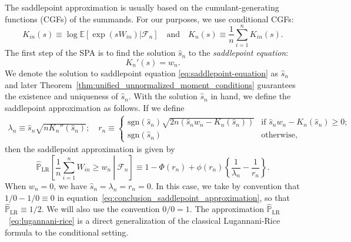 \documentclass[12pt]{article}
\theoremstyle{definition}
\def\P{\mathbb{P}}
\def\sgn{\mathrm{sgn}}
\def\P{\mathbb{P}}
\newcommand{\E}{\mathbb E}								%
\renewcommand{\P}{\mathbb{P}}							%
\begin{document}
  The saddlepoint approximation is usually based on the cumulant-generating functions (CGFs) of the summands. For our purposes, we use conditional CGFs:
  \begin{equation}\label{eq:CCGF_def}
  K_{in}(s) \equiv \log \E[\exp(sW_{in})|\mathcal F_n] \quad \text{and} \quad K_n(s) \equiv \frac{1}{n}\sum_{i = 1}^n K_{in}(s).
  \end{equation}
  The first step of the SPA is to find the solution $\hat s_n$ to the \textit{saddlepoint equation}:
  \begin{equation}\label{eq:saddlepoint-equation}
  K_n'(s) = w_n.
  \end{equation}
  We denote the solution to saddlepoint equation \eqref{eq:saddlepoint-equation} as $\hat s_n$ and later Theorem~\ref{thm:unified_unnormalized_moment_conditions} guarantees the existence and uniqueness of $\hat s_n$. With the solution $\hat s_n$ in hand, we define the saddlepoint approximation as follows. If we define
  \small
  \begin{align}\label{eq:lam_n_r_n_def}
	\lambda_n \equiv \hat s_n\sqrt{nK_n''(\hat s_n)}; \quad r_n \equiv
	\begin{cases}
	  \sgn(\hat s_n) \sqrt{2n( \hat s_n w_n - K_n(\hat s_n))} & \text{if } \hat s_n w_n - K_n(\hat s_n)\geq 0;\\
	  \mathrm{sgn}(\hat s_n) & \text{otherwise},
	\end{cases}
	\end{align}
  \normalsize
  then the saddlepoint approximation is given by
  \begin{equation}
  \widehat{\P}_{\text{LR}}\left[\left.\frac{1}{n}\sum_{i = 1}^n W_{in} \geq w_n\ \right|\ \mathcal{F}_n\right] \equiv 1-\Phi(r_n)+\phi(r_n)\left\{\frac{1}{\lambda_n}-\frac{1}{r_n}\right\}. \label{eq:lugannani-rice}
  \end{equation}
  When $w_n = 0$, we have $\hat s_n = \lambda_n = r_n = 0$. In this case, we take by convention that $1/0 - 1/0 \equiv 0$ in equation~\eqref{eq:conclusion_saddlepoint_approximation}, so that $\widehat{\P}_{\text{LR}} \equiv 1/2$. We will also use the convention $0/0=1$. The approximation $\widehat{\P}_{\text{LR}}$~\eqref{eq:lugannani-rice} is a direct generalization of the classical Lugannani-Rice formula \citep{Lugannani1980} to the conditional setting.
  
\end{document}
